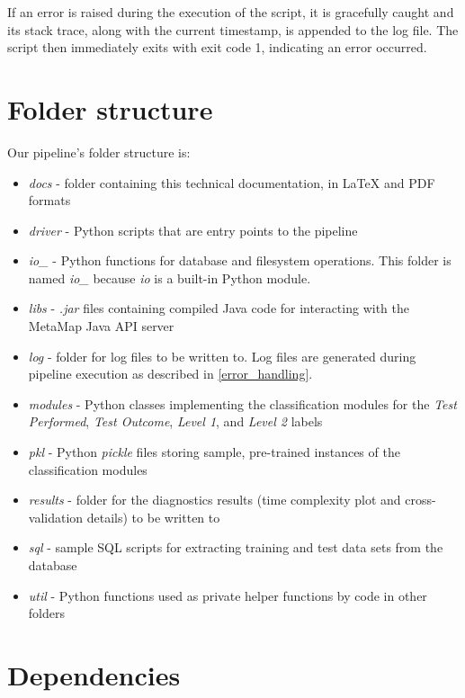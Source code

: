 \documentclass[a4paper]{article}
\begin{document}
If an error is raised during the execution of the script, it is gracefully caught and its stack trace, along with the current timestamp, is appended to the log file. The script then immediately exits with exit code 1, indicating an error occurred.

\section{Folder structure}

Our pipeline's folder structure is:

\begin{itemize}
\item \textit{docs} - folder containing this technical documentation, in LaTeX and PDF formats
\item \textit{driver} - Python scripts that are entry points to the pipeline
\item \textit{io\_} - Python functions for database and filesystem operations. This folder is named \textit{io\_} because \textit{io} is a built-in Python module.
\item \textit{libs} - \textit{.jar} files containing compiled Java code for interacting with the MetaMap Java API server
\item \textit{log} - folder for log files to be written to. Log files are generated during pipeline execution as described in \ref{error_handling}.
\item \textit{modules} - Python classes implementing the classification modules for the \textit{Test Performed}, \textit{Test Outcome}, \textit{Level 1}, and \textit{Level 2} labels
\item \textit{pkl} - Python \textit{pickle} files storing sample, pre-trained instances of the classification modules
\item \textit{results} - folder for the diagnostics results (time complexity plot and cross-validation details) to be written to
\item \textit{sql} - sample SQL scripts for extracting training and test data sets from the database
\item \textit{util} - Python functions used as private helper functions by code in other folders
\end{itemize}

\section{Dependencies}
\end{document}
